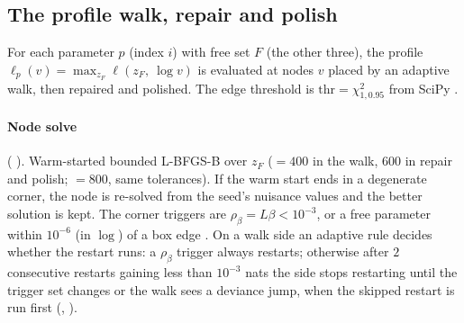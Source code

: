 \subsection{The profile walk, repair and polish}\label{sec:pv-profile}

For each parameter $p$ (index $i$) with free set $F$ (the other three), the profile
$\ell_p(v)=\max_{z_F}\ell(z_F,\ \log v)$ is evaluated at nodes $v$ placed by an adaptive walk, then repaired and
polished. The edge threshold is $\mathrm{thr}=\chi^2_{1,0.95}$ from SciPy .

\paragraph{Node solve} ( ). Warm-started bounded L-BFGS-B
over $z_F$ ($=400$ in the walk, $600$ in repair and polish; $=800$, same tolerances).
If the warm start ends in a degenerate corner, the node is re-solved from the seed's nuisance values and the
better solution is kept. The corner triggers are $\rho_\beta=L\beta<10^{-3}$, or a free parameter within
$10^{-6}$ (in $\log$) of a box edge . On a walk side an adaptive rule
decides whether the restart runs: a $\rho_\beta$ trigger always restarts; otherwise after $2$ consecutive
restarts gaining less than $10^{-3}$ nats the side stops restarting until the trigger set changes or the walk
sees a deviance jump, when the skipped restart is run first (, 
).

